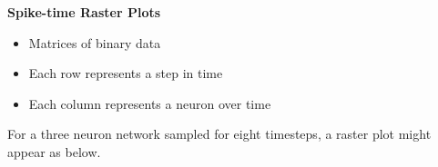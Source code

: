 \documentclass[12pt]{article}
\begin{document}
\begin{posterbard}
	\begin{posterbox}
		\begin{center}\textbf{Spike-time Raster Plots}\end{center}
		\begin{itemize}
			\item Matrices of binary data
			\item Each row represents a step in time
			\item Each column represents a neuron over time
		\end{itemize}
		For a three neuron network sampled for eight timesteps, a raster plot 
		might appear as below.
		\begin{center}
		\end{center}
		\vspace{\baselineskip}
	\end{posterbox}


\end{posterbard}
\end{document}
